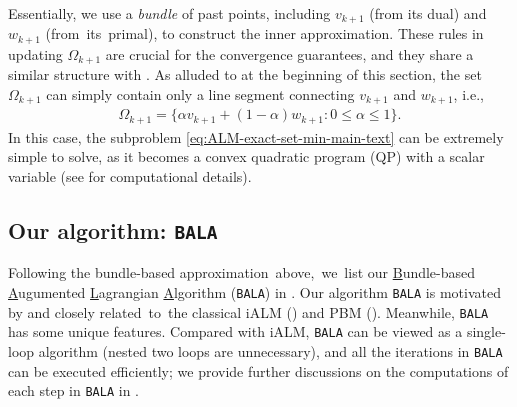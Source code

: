 \documentclass[11pt]{article}
\newcommand{\alg}{\texttt{BALA}}%
\begin{document}
\vspace{-2mm}

Essentially, we use a \textit{bundle} of past points, including $v_{k+1}$ (from its dual) and $w_{k+1}$ (from~its~primal), to construct the inner approximation. These rules in updating $\Omega_{k+1}$ are crucial for the convergence guarantees, and they share a similar structure with . As alluded to at the beginning of this section, the set $\Omega_{k+1}$ can simply contain only a line segment connecting $v_{k+1}$ and $w_{k+1}$, i.e.,
\begin{align*}
    \Omega_{k+1} =  \{\alpha v_{k+1} +  (1-\alpha) w_{k+1} : 0  \leq \alpha \leq 1 \}.
\end{align*}
In this case, the subproblem \cref{eq:ALM-exact-set-min-main-text} can be extremely simple to solve, as it becomes a convex quadratic program (QP) with a scalar variable ({see  for computational details}). 


\subsection{Our algorithm: \alg}

Following the bundle-based approximation~above,~we~list our \underline{B}undle-based \underline{A}ugumented \underline{L}agrangian \underline{A}lgorithm (\alg) in . 
Our algorithm \alg{} is motivated by and closely related~to~the classical iALM () and PBM (). 
% 
Meanwhile, \alg{} has some unique features. Compared with iALM, \alg{} can be viewed as a single-loop algorithm (nested two loops are unnecessary), and {all the iterations in \alg{} can be executed efficiently}; we provide further discussions on the computations of each step in \alg{} in . 
\end{document}
